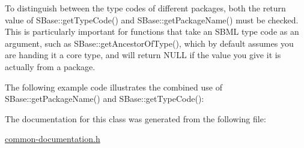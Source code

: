 \begin{DoxyItemize}
\item To distinguish between the type codes of different packages, both the return value of S\+Base\+::get\+Type\+Code() and S\+Base\+::get\+Package\+Name() must be checked. This is particularly important for functions that take an S\+B\+ML type code as an argument, such as S\+Base\+::get\+Ancestor\+Of\+Type(), which by default assumes you are handing it a core type, and will return {\ttfamily N\+U\+LL} if the value you give it is actually from a package.\end{DoxyItemize}
The following example code illustrates the combined use of S\+Base\+::get\+Package\+Name() and S\+Base\+::get\+Type\+Code()\+: 

The documentation for this class was generated from the following file\+:\begin{DoxyCompactItemize}
\item 
\hyperlink{common-documentation_8h}{common-\/documentation.\+h}\end{DoxyCompactItemize}
